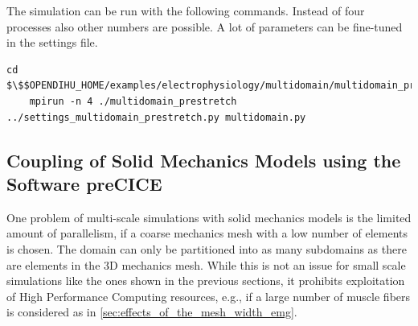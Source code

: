 




\begin{reproduce_no_break}
  The simulation can be run with the following commands. Instead of four processes also other numbers are possible. A lot of parameters can be fine-tuned in the  settings file.
  \begin{lstlisting}[columns=fullflexible,breaklines=true,postbreak=\mbox{\textcolor{gray}{$\hookrightarrow$}\space}]
    cd $\$$OPENDIHU_HOME/examples/electrophysiology/multidomain/multidomain_prestretch/build_release
    mpirun -n 4 ./multidomain_prestretch ../settings_multidomain_prestretch.py multidomain.py
  \end{lstlisting}
\end{reproduce_no_break}

%

%
\subsection{Coupling of Solid Mechanics Models using the Software preCICE}\label{sec:volume_coupling_contraction}

One problem of multi-scale simulations with solid mechanics models is the limited amount of parallelism, 
if a coarse mechanics mesh with a low number of elements is chosen. The domain can only be partitioned into as many subdomains as there are elements in the 3D mechanics mesh. While this is not an issue for small scale simulations like the ones shown in the previous sections, it prohibits exploitation of High Performance Computing resources, e.g., if a large number of muscle fibers is considered as in \cref{sec:effects_of_the_mesh_width_emg}.

